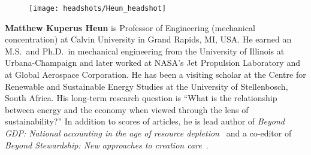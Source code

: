 \setlength{\intextsep}{-7pt}%
\setlength{\columnsep}{8pt}%
\begin{figure}
  \begin{center}
    \texttt{[image: headshots/Heun\_headshot]}
  \end{center}
\end{figure}
\textbf{Matthew Kuperus Heun} is Professor of Engineering 
(mechanical concentration)
at Calvin University in Grand Rapids, MI, USA.
He earned an M.S.\ and Ph.D.\ in mechanical engineering from 
the University of Illinois at Urbana-Champaign and 
later worked at NASA's Jet Propulsion Laboratory and at Global Aerospace Corporation. 
He has been a visiting scholar at the Centre for Renewable and Sustainable Energy Studies 
at the University of Stellenbosch, South Africa. 
His long-term research question is 
``What is the relationship between energy and the economy when viewed through the lens of sustainability?''
In addition to scores of articles, he is lead author of 
\emph{Beyond GDP: National accounting in the age of resource depletion}~\citep{Heun:2015aa} 
and a co-editor of
\emph{Beyond Stewardship: New approaches to creation care}~\citep{Warners:2019aa}.





